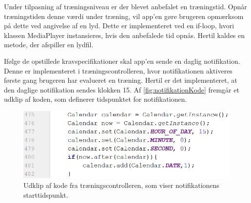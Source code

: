 Under tilpasning af træningsniveau er der blevet anbefalet en træningstid. Opnår træningstiden denne værdi under træning, vil app'en gøre brugeren opmærksom på dette ved angivelse af en lyd. Dette er implementeret ved en if-loop, hvori klassen MediaPlayer instansieres, hvis den anbefalede tid opnås. Hertil kaldes en metode, der afspiller en lydfil. 

Ifølge de opstillede kravspecifikationer skal app'en sende en daglig notifikation. Denne er implementeret i træningscontrolleren, hvor notifikationen aktiveres første gang brugeren har evalueret en træning. Hertil er det implementeret, at den daglige notifikation sendes klokken 15. Af \autoref{fig:notifikationKode} fremgår et udklip af koden, som definerer tidspunktet for notifikationen. 

\begin{figure} [H]
\centering
\includegraphics[width=1\textwidth]{figures/imple/notifikationKode}
\caption{Udklip af kode fra træningscontrolleren, som viser notifikationens starttidspunkt.}
\label{fig:notifikationKode}
\end{figure} 







